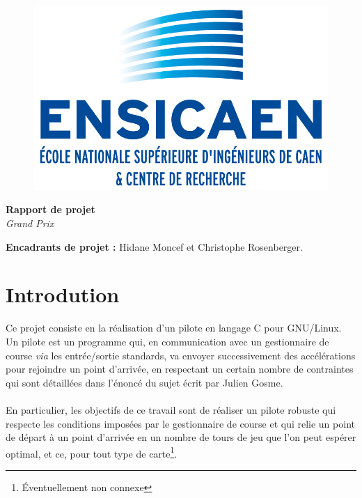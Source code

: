 \documentclass[a4paper,10pt]{article}
\title{}
\author{Hicham Benjelloun}
\date{}
\begin{document}
\begin{figure}[!h]
 \centering
 \includegraphics[scale=0.6]{logo.jpg}
\end{figure}

\begin{center}
 {\Large \textbf{Rapport de projet}} \\
 \textit{Grand Prix} \\
\end{center}
\textbf{Encadrants de projet :} Hidane Moncef et Christophe Rosenberger.

\renewcommand{\contentsname}{Table des matières}
\tableofcontents

\section{Introdution}

Ce projet consiste en la réalisation d'un pilote en langage C pour GNU/Linux. Un pilote est un programme qui, en communication avec un gestionnaire de course \textit{via} les entrée/sortie standards, va envoyer successivement des accélérations
pour rejoindre un point d'arrivée, en respectant un certain nombre de contraintes qui sont détaillées dans l'énoncé du sujet écrit par Julien Gosme.
\\
\\
En particulier, les objectifs de ce travail sont de réaliser un pilote robuste qui respecte les conditions imposées par le gestionnaire de course et qui relie un point de départ à un point d'arrivée en un nombre de tours de jeu que l'on peut espérer
optimal, et ce, pour tout type de carte\footnote{Éventuellement non connexe}.
\end{document}
